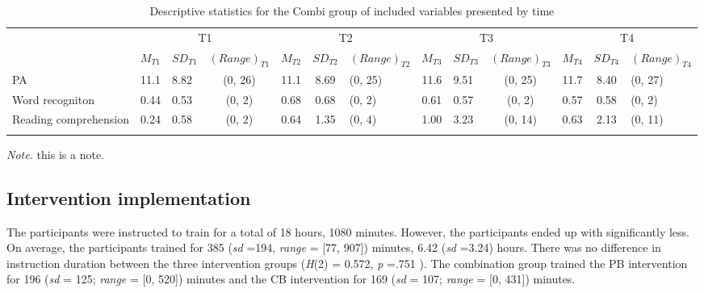 \documentclass[
]{article}
\begin{document}
\begin{table}[tbp]

\begin{center}
\begin{threeparttable}

\caption{\label{tab:desc-read-combi-table}Descriptive statistics for the Combi group of included variables presented by time}

\small{

\begin{tabular}{lclclclclclcl}
\toprule
 & \multicolumn{3}{c}{T1} & \multicolumn{3}{c}{T2} & \multicolumn{3}{c}{T3} & \multicolumn{3}{c}{T4} \\
\cmidrule(r){2-4} \cmidrule(r){5-7} \cmidrule(r){8-10} \cmidrule(r){11-13}
  & $M_{T1}$ & $SD_{T1}$ & $(Range)_{T1}$ & $M_{T2}$ & $SD_{T2}$ & $(Range)_{T2}$ & $M_{T3}$ & $SD_{T3}$ & $(Range)_{T3}$ & $M_{T4}$ & $SD_{T4}$ & $(Range)_{T4}$\\
\midrule
PA & 11.1 & 8.82 & (0, 26) & 11.1 & 8.69 & (0, 25) & 11.6 & 9.51 & (0, 25) & 11.7 & 8.40 & (0, 27)\\
Word recogniton & 0.44 & 0.53 & (0, 2) & 0.68 & 0.68 & (0, 2) & 0.61 & 0.57 & (0, 2) & 0.57 & 0.58 & (0, 2)\\
Reading comprehension & 0.24 & 0.58 & (0, 2) & 0.64 & 1.35 & (0, 4) & 1.00 & 3.23 & (0, 14) & 0.63 & 2.13 & (0, 11)\\
\bottomrule
\addlinespace
\end{tabular}

}

\begin{tablenotes}[para]
\normalsize{\textit{Note.} this is a note.}
\end{tablenotes}

\end{threeparttable}
\end{center}

\end{table}

\hypertarget{intervention-implementation}{%
\subsection{Intervention
implementation}\label{intervention-implementation}}

The participants were instructed to train for a total of 18 hours, 1080
minutes. However, the participants ended up with significantly less. On
average, the participants trained for 385 (\emph{sd} =194, \emph{range}
= {[}77, 907{]}) minutes, 6.42 (\emph{sd} =3.24) hours. There was no
difference in instruction duration between the three intervention groups
(\emph{H}(2) = 0.572, \emph{p} =.751 ). The combination group trained
the PB intervention for 196 (\emph{sd} = 125; \emph{range} = {[}0,
520{]}) minutes and the CB intervention for 169 (\emph{sd} = 107;
\emph{range} = {[}0, 431{]}) minutes.
\end{document}

